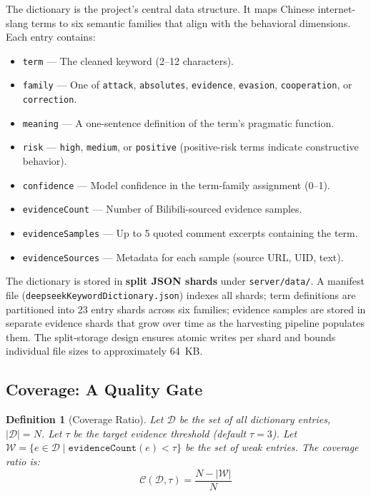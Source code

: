 \documentclass[11pt,a4paper]{article}
\newtheorem{definition}{Definition}[section]
\begin{document}
The dictionary is the project's central data structure. It maps Chinese internet-slang
terms to six semantic families that align with the behavioral dimensions. Each entry
contains:

\begin{itemize}
  \item \texttt{term} --- The cleaned keyword (2--12 characters).
  \item \texttt{family} --- One of \texttt{attack}, \texttt{absolutes}, \texttt{evidence},
    \texttt{evasion}, \texttt{cooperation}, or \texttt{correction}.
  \item \texttt{meaning} --- A one-sentence definition of the term's pragmatic function.
  \item \texttt{risk} --- \texttt{high}, \texttt{medium}, or \texttt{positive}
    (positive-risk terms indicate constructive behavior).
  \item \texttt{confidence} --- Model confidence in the term-family assignment (0--1).
  \item \texttt{evidenceCount} --- Number of Bilibili-sourced evidence samples.
  \item \texttt{evidenceSamples} --- Up to 5 quoted comment excerpts containing the term.
  \item \texttt{evidenceSources} --- Metadata for each sample (source URL, UID, text).
\end{itemize}

The dictionary is stored in \textbf{split JSON shards} under
\texttt{server/data/}. A manifest file
(\texttt{deepseekKeywordDictionary.json}) indexes all shards; term definitions
are partitioned into 23 entry shards across six families; evidence samples are
stored in separate evidence shards that grow over time as the harvesting pipeline
populates them. The split-storage design ensures atomic writes per shard and
bounds individual file sizes to approximately 64~KB.

\subsection{Coverage: A Quality Gate}

\begin{definition}[Coverage Ratio]
  Let $\mathcal{D}$ be the set of all dictionary entries, $|\mathcal{D}| = N$.
  Let $\tau$ be the target evidence threshold (default $\tau = 3$).
  Let $\mathcal{W} = \{e \in \mathcal{D} \mid \texttt{evidenceCount}(e) < \tau\}$
  be the set of weak entries. The coverage ratio is:
  \begin{equation}
    \mathcal{C}(\mathcal{D}, \tau) = \frac{N - |\mathcal{W}|}{N}
    \label{eq:coverage}
  \end{equation}
\end{definition}
\end{document}
